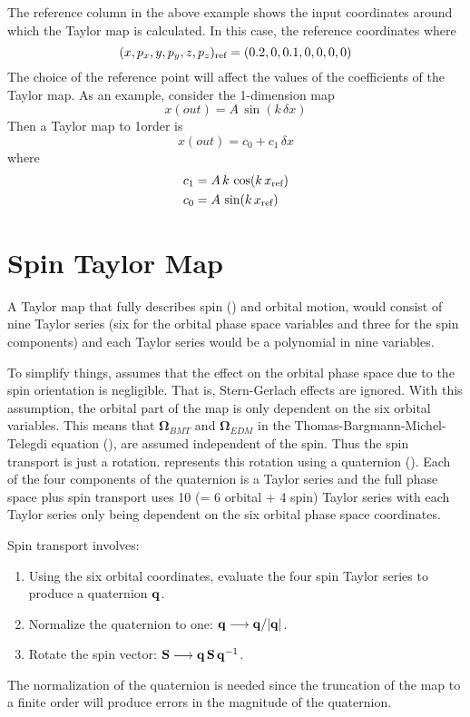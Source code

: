 The reference column in the above example shows the input coordinates around
which the Taylor map is calculated. In this case, the reference
coordinates where 
\begin{equation}
  (x, p_x, y, p_y, z, p_z)_{\text{ref}} = (0.2, 0, 0.1, 0, 0, 0, 0)
\end{equation}
The choice of the reference point will affect the values of the
coefficients of the Taylor map. As an example, consider the 1-dimension map
\begin{equation}
  x(out) = A \, \sin(k \, \delta x)
\end{equation}
Then a Taylor map to 1\St order is
\begin{equation}
  x(out) = c_0 + c_1 \, \delta x
\end{equation}
where
\begin{align}
  c_1 &= A \, k \, \cos(k \, x_{\text{ref}}) \\
  c_0 &= A \, \sin(k \, x_{\text{ref}})
\end{align}

\section{Spin Taylor Map}
\label{s:spin.map}

A Taylor map that fully describes spin () and orbital motion, would consist of nine
Taylor series (six for the orbital phase space variables and three for the spin components) and each
Taylor series would be a polynomial in nine variables.

To simplify things, \bmad assumes that the effect on the orbital phase space due to the spin
orientation is negligible. That is, Stern-Gerlach effects are ignored. With this assumption, the
orbital part of the map is only dependent on the six orbital variables. This means that
${\pmb\Omega}_{BMT}$ and ${\pmb\Omega}_{EDM}$ in the Thomas-Bargmann-Michel-Telegdi equation
(), are assumed independent of the spin. Thus the spin transport is just a rotation.
\bmad represents this rotation using a quaternion (). Each of the four components of
the quaternion is a Taylor series and the full phase space plus spin transport uses 10 (= 6 orbital
+ 4 spin) Taylor series with each Taylor series only being dependent on the six orbital phase space
coordinates.

Spin transport involves:
\begin{enumerate}[itemsep=-0.6ex, topsep=-0.9ex]
\item Using the six orbital coordinates, evaluate the four spin Taylor series to produce a quaternion ${\bf q}$.
\item Normalize the quaternion to one: ${\bf q} \longrightarrow {\bf q}/|{\bf q}|$.
\item Rotate the spin vector: ${\bf S} \longrightarrow {\bf q} \, {\bf S} \, {\bf q}^{-1}$.
\end{enumerate}
The  normalization of the quaternion is needed since the truncation of the map to a finite order will produce errors
in the magnitude of the quaternion.

